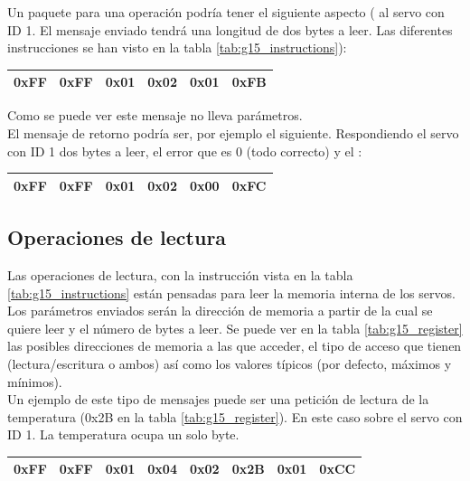 	Un paquete para una operación  podría tener el siguiente aspecto ( al servo con ID 1. El mensaje enviado tendrá una longitud de dos bytes a leer. Las diferentes instrucciones se han visto en la tabla \ref{tab:g15_instructions}):
	\begin{center}
		\begin{tabular}{|c|c|c|c|c|c|}
			\hline
			0xFF & 0xFF & 0x01 & 0x02 & 0x01 & 0xFB \\
			\hline
		\end{tabular}
	\end{center}

	Como se puede ver este mensaje no lleva parámetros.
	\\

	El mensaje de retorno podría ser, por ejemplo el siguiente. Respondiendo el servo con ID 1 dos bytes a leer, el error que es 0 (todo correcto) y el :
	\begin{center}
		\begin{tabular}{|c|c|c|c|c|c|}
			\hline
			0xFF & 0xFF & 0x01 & 0x02 & 0x00 & 0xFC \\
			\hline
		\end{tabular}
	\end{center}

	\subsection{Operaciones de lectura}

	Las operaciones de lectura, con la instrucción  vista en la tabla \ref{tab:g15_instructions} están pensadas para leer la memoria interna de los servos. Los parámetros enviados serán la dirección de memoria a partir de la cual se quiere leer y el número de bytes a leer. Se puede ver en la tabla \ref{tab:g15_register} las posibles direcciones de memoria a las que acceder, el tipo de acceso que tienen (lectura/escritura o ambos) así como los valores típicos (por defecto, máximos y mínimos).
	\\

	Un ejemplo de este tipo de mensajes puede ser una petición de lectura de la temperatura (0x2B en la tabla \ref{tab:g15_register}). En este caso sobre el servo con ID 1. La temperatura ocupa un solo byte.

	\begin{center}
		\begin{tabular}{|c|c|c|c|c|c|c|c|}
			\hline
			0xFF & 0xFF & 0x01 & 0x04 & 0x02 & 0x2B & 0x01 & 0xCC \\
			\hline
		\end{tabular}
	\end{center}

